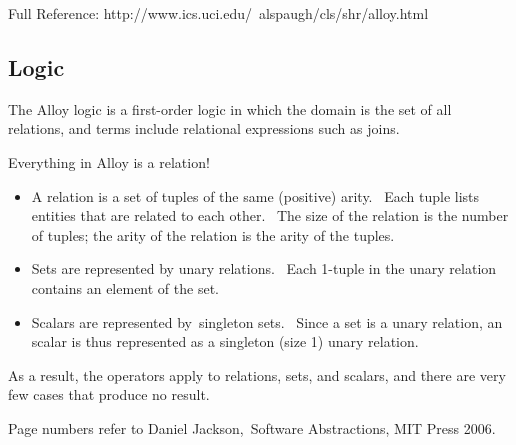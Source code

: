 \documentclass[oneside]{book}
\begin{document}
Full Reference: http://www.ics.uci.edu/~alspaugh/cls/shr/alloy.html

\subsection{Logic}
The Alloy logic is a first-order logic in which the domain is the set of all relations, and terms include relational expressions such as joins.~

Everything in Alloy is a relation!~

\begin{itemize}
\item A relation is a set of tuples of the same (positive) arity.~ Each tuple lists entities that are related to each other.~ The size of the relation is the number of tuples; the arity of the relation is the arity of the tuples.~
\item Sets are represented by unary relations.~ Each 1-tuple in the unary relation contains an element of the set.~
\item Scalars are represented by~singleton sets.~ Since a set is a unary relation, an scalar is thus represented as a singleton (size 1) unary relation.~
\end{itemize}
As a result, the operators apply to relations, sets, and scalars, and there are very few cases that produce no result.~

Page numbers refer to Daniel Jackson,~Software Abstractions, MIT Press 2006.~

\newpage
\end{document}
